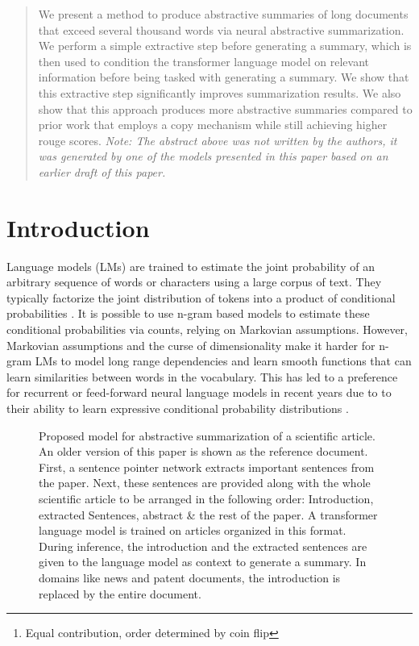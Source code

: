 \documentclass[letterpaper]{article} \usepackage{arXiv_V2_aaai_sty_mods}  \usepackage{times}  \usepackage{helvet} \usepackage{courier}  \usepackage[hyphens]{url}  \usepackage{graphicx} \usepackage[utf8]{inputenc} \usepackage[T1]{fontenc}    \usepackage{url}            \usepackage{booktabs}       \usepackage{amsfonts}       \usepackage{nicefrac}       \usepackage{multirow}
\author{Sandeep Subramanian\thanks{Equal contribution, order determined by coin flip} , Raymond Li, Jonathan Pilault, Christopher Pal \\
Element AI, Montréal Institute for Learning Algorithms, Université de Montréal, \\École Polytechnique de Montréal, Canada CIFAR AI Chair \\
\texttt{\{jonathan.pilault\}@elementai.com}}
\begin{document}
\maketitle

\begin{abstract}
We present a method to produce abstractive summaries of long documents that exceed several thousand words via neural abstractive summarization. We perform a simple extractive step before generating a summary, which is then used to condition the transformer language model on relevant information before being tasked with generating a summary. We show that this extractive step significantly improves summarization results. We also show that this approach produces more abstractive summaries compared to prior work that employs a copy mechanism  while still achieving higher rouge scores.
\textit{Note: The abstract above was not written by the authors, it was generated by one of the models presented in this paper based on an earlier draft of this paper.}
\end{abstract}

\section{Introduction}
\label{sec:intro}
Language models (LMs) are trained to estimate the joint probability of an arbitrary sequence of words or characters using a large corpus of text. They typically factorize the joint distribution of tokens  into a product of conditional probabilities . It is possible to use n-gram based models to estimate these conditional probabilities via counts, relying on Markovian assumptions. However, Markovian assumptions and the curse of dimensionality make it harder for n-gram LMs to model long range dependencies and learn smooth functions that can learn similarities between words in the vocabulary. This has led to a preference for recurrent or feed-forward neural language models \cite{bengio2003neural,mikolov2010recurrent} in recent years due to to their ability to learn expressive conditional probability distributions \cite{radford2019language}.

\begin{figure}[htb]
    \caption{\label{fig:model} \small Proposed model for abstractive summarization of a scientific article. An older version of this paper is shown as the reference document. First, a sentence pointer network extracts important sentences from the paper. Next, these sentences are provided along with the whole scientific article to be arranged in the following order: Introduction, extracted Sentences, abstract \& the rest of the paper. A transformer language model is trained on articles organized in this format. During inference, the introduction and the extracted sentences are given to the language model as context to generate a summary. In domains like news and patent documents, the introduction is replaced by the entire document. }
\end{figure}
\end{document}
